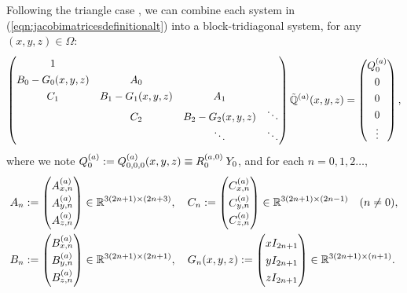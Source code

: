 \documentclass[11pt, oneside]{article}   	%
\begin{document}
Following the triangle case \cite{olver2019triangle}, we can combine each system in (\ref{eqn:jacobimatricesdefinitionalt}) into a block-tridiagonal system, for any $(x,y,z) \in \Omega$:
\begin{align*}
	\renewcommand\arraystretch{1.3}
	\begin{pmatrix}
		1 & & & \\
		B_0-G_0(x,y,z) & A_0 & & \\
		C_1 & B_1-G_1(x,y,z) & \quad A_1 \quad & \\
		& C_2 & B_2 - G_2(x,y,z)  & \ddots \\
		& & \ddots &\ddots
	\end{pmatrix}
	\bigscopta(x,y,z) =
		\begin{pmatrix}
	 		\scopa_0 \\ 0 \\ 0 \\ 0 \\ \vdots  \\
		\end{pmatrix},
\end{align*}
where we note $Q^{(a)}_0 := Q^{(a)}_{0,0,0}(x,y,z) \equiv R_0^{(a,0)} \: Y_0$, and for each $n = 0,1,2\dots$,
\begin{align*}
	A_n &:= 
		\begin{pmatrix}
			A^{(a)}_{x,n} \\
			A^{(a)}_{y,n} \\
			A^{(a)}_{z,n}
		\end{pmatrix} \in \R^{3(2n+1)\times(2n+3)}, \quad
	C_n := 
		\begin{pmatrix}
			C^{(a)}_{x,n} \\
			C^{(a)}_{y,n} \\
			C^{(a)}_{z,n}
		\end{pmatrix} \in \R^{3(2n+1)\times(2n-1)} \quad (n \ne 0), \nonumber \\
	B_n &:= 
		\begin{pmatrix}
			B^{(a)}_{x,n} \\
			B^{(a)}_{y,n} \\
			B^{(a)}_{z,n}
		\end{pmatrix} \in \R^{3(2n+1)\times(2n+1)}, \quad
	G_n(x,y,z) := 
		\begin{pmatrix}
			xI_{2n+1} \\
			yI_{2n+1} \\
			zI_{2n+1}
		\end{pmatrix} \in \R^{3(2n+1)\times(n+1)}.
\end{align*}
 
\end{document}
